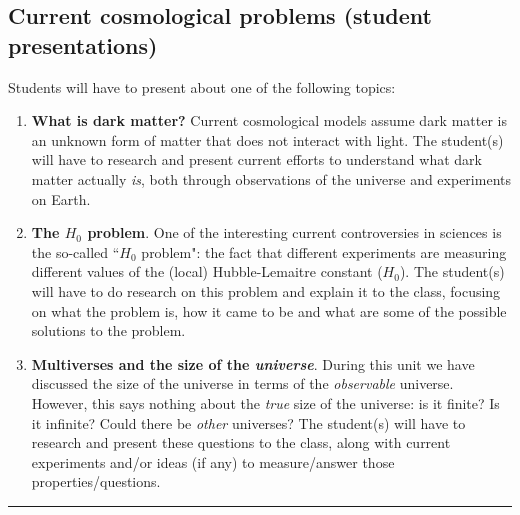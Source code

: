 \documentclass{tufte-handout}
\begin{document}
\begin{fullwidth}
\subsection{Current cosmological problems (student presentations)}
Students will have to present about one of the following topics:
\begin{enumerate}
\item \textbf{What is dark matter?} Current cosmological models assume dark matter is an unknown form of matter that does not interact with light. The student(s) will have to research and present current efforts to understand what dark matter actually \textit{is}, both through observations of the universe and experiments on Earth.
\item \textbf{The $H_0$ problem}. One of the interesting current controversies in sciences is the so-called ``$H_0$ problem": the fact that different experiments are measuring different values of the (local) Hubble-Lemaitre constant ($H_0$). The student(s) will have to do research on this problem and explain it to the class, focusing on what the problem is, how it came to be and what are some of the possible solutions to the problem.
\item \textbf{Multiverses and the size of the \textit{universe}}. During this unit we have discussed the size of the universe in terms of the \textit{observable} universe. However, this says nothing about the \textit{true} size of the universe: is it finite? Is it infinite? Could there be \textit{other} universes? The student(s) will have to research and present these questions to the class, along with current experiments  and/or ideas (if any) to measure/answer those properties/questions.
\end{enumerate}


\end{fullwidth}
\pagebreak

\noindent\textcolor{Red}{\rule{16cm}{3mm}}
\end{document}
